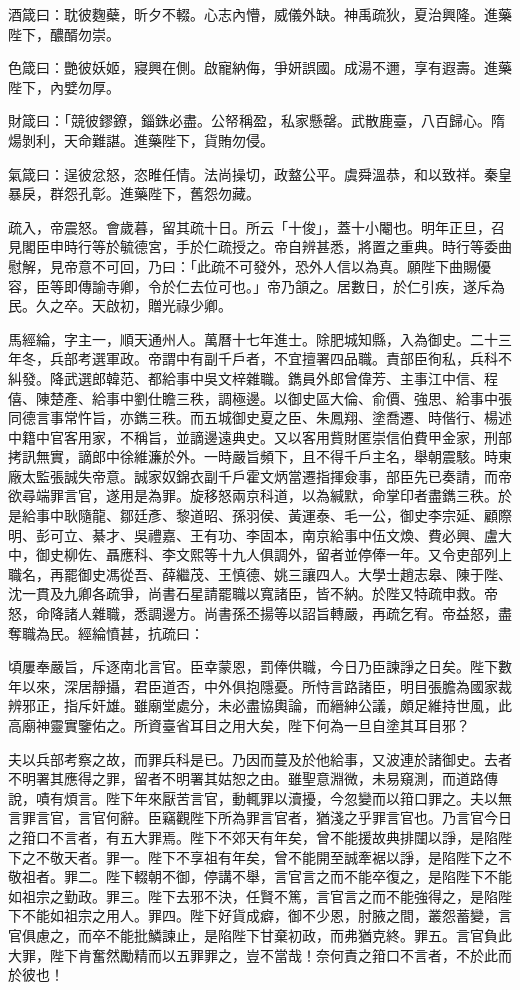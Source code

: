\begin{pinyinscope}
酒箴曰：耽彼麴蘗，昕夕不輟。心志內懵，威儀外缺。神禹疏狄，夏治興隆。進藥陛下，醲醑勿崇。

色箴曰：艷彼妖姬，寢興在側。啟寵納侮，爭妍誤國。成湯不邇，享有遐壽。進藥陛下，內嬖勿厚。

財箴曰：「競彼鏐鐐，錙銖必盡。公帑稱盈，私家懸罄。武散鹿臺，八百歸心。隋煬剝利，天命難諶。進藥陛下，貨賄勿侵。

氣箴曰：逞彼忿怒，恣睢任情。法尚操切，政盩公平。虞舜溫恭，和以致祥。秦皇暴戾，群怨孔彰。進藥陛下，舊怨勿藏。

疏入，帝震怒。會歲暮，留其疏十日。所云「十俊」，蓋十小閹也。明年正旦，召見閣臣申時行等於毓德宮，手於仁疏授之。帝自辨甚悉，將置之重典。時行等委曲慰解，見帝意不可回，乃曰：「此疏不可發外，恐外人信以為真。願陛下曲賜優容，臣等即傳諭寺卿，令於仁去位可也。」帝乃頷之。居數日，於仁引疾，遂斥為民。久之卒。天啟初，贈光祿少卿。

馬經綸，字主一，順天通州人。萬曆十七年進士。除肥城知縣，入為御史。二十三年冬，兵部考選軍政。帝謂中有副千戶者，不宜擅署四品職。責部臣徇私，兵科不糾發。降武選郎韓范、都給事中吳文梓雜職。鐫員外郎曾偉芳、主事江中信、程僖、陳楚產、給事中劉仕瞻三秩，調極邊。以御史區大倫、俞價、強思、給事中張同德言事常忤旨，亦鐫三秩。而五城御史夏之臣、朱鳳翔、塗喬遷、時偕行、楊述中籍中官客用家，不稱旨，並謫邊遠典史。又以客用貲財匿崇信伯費甲金家，刑部拷訊無實，謫郎中徐維濂於外。一時嚴旨頻下，且不得千戶主名，舉朝震駭。時東廠太監張誠失帝意。誠家奴錦衣副千戶霍文炳當遷指揮僉事，部臣先已奏請，而帝欲尋端罪言官，遂用是為罪。旋移怒兩京科道，以為緘默，命掌印者盡鐫三秩。於是給事中耿隨龍、鄒廷彥、黎道昭、孫羽侯、黃運泰、毛一公，御史李宗延、顧際明、彭可立、綦才、吳禮嘉、王有功、李固本，南京給事中伍文煥、費必興、盧大中，御史柳佐、聶應科、李文熙等十九人俱調外，留者並停俸一年。又令吏部列上職名，再罷御史馮從吾、薛繼茂、王慎德、姚三讓四人。大學士趙志皋、陳于陛、沈一貫及九卿各疏爭，尚書石星請罷職以寬諸臣，皆不納。於陛又特疏申救。帝怒，命降諸人雜職，悉調邊方。尚書孫丕揚等以詔旨轉嚴，再疏乞宥。帝益怒，盡奪職為民。經綸憤甚，抗疏曰：

頃屢奉嚴旨，斥逐南北言官。臣幸蒙恩，罰俸供職，今日乃臣諫諍之日矣。陛下數年以來，深居靜攝，君臣道否，中外俱抱隱憂。所恃言路諸臣，明目張膽為國家裁辨邪正，指斥奸雄。雖廟堂處分，未必盡協輿論，而縉紳公議，頗足維持世風，此高廟神靈實鑒佑之。所資臺省耳目之用大矣，陛下何為一旦自塗其耳目邪？

夫以兵部考察之故，而罪兵科是已。乃因而蔓及於他給事，又波連於諸御史。去者不明署其應得之罪，留者不明署其姑恕之由。雖聖意淵微，未易窺測，而道路傳說，嘖有煩言。陛下年來厭苦言官，動輒罪以瀆擾，今忽變而以箝口罪之。夫以無言罪言官，言官何辭。臣竊觀陛下所為罪言官者，猶淺之乎罪言官也。乃言官今日之箝口不言者，有五大罪焉。陛下不郊天有年矣，曾不能援故典排闥以諍，是陷陛下之不敬天者。罪一。陛下不享祖有年矣，曾不能開至誠牽裾以諍，是陷陛下之不敬祖者。罪二。陛下輟朝不御，停講不舉，言官言之而不能卒復之，是陷陛下不能如祖宗之勤政。罪三。陛下去邪不決，任賢不篤，言官言之而不能強得之，是陷陛下不能如祖宗之用人。罪四。陛下好貨成癖，御不少恩，肘腋之間，叢怨蓄變，言官俱慮之，而卒不能批鱗諫止，是陷陛下甘棄初政，而弗猶克終。罪五。言官負此大罪，陛下肯奮然勵精而以五罪罪之，豈不當哉！奈何責之箝口不言者，不於此而於彼也！


\end{pinyinscope}
